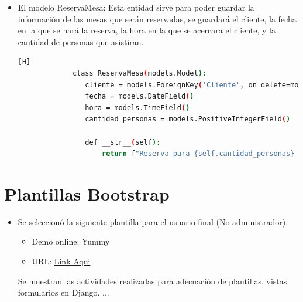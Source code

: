 \documentclass{article}
\begin{document}
\begin{itemize}
\begin{lstlisting}[language=bash,caption={Modelo de carrio}][H]
                def __str__(self):
                    return f"Carrito de {self.cliente.nombre}"
	  \end{lstlisting}
        \item El modelo ReservaMesa: Esta entidad sirve para poder guardar la información de las mesas que serán reservadas, se guardará el cliente, la fecha en la que se hará la reserva, la hora en la que se acercara el cliente, y la cantidad de personas que asistiran.
        \begin{lstlisting}[language=bash,caption={Modelo de ReservaMesa}][H]
		     class ReservaMesa(models.Model):
                cliente = models.ForeignKey('Cliente', on_delete=models.CASCADE)
                fecha = models.DateField()
                hora = models.TimeField()
                cantidad_personas = models.PositiveIntegerField()

                def __str__(self):
                    return f"Reserva para {self.cantidad_personas} personas el {self.fecha} a las {self.hora}"
	  \end{lstlisting}
  
	\end{itemize}


	\section{Plantillas Bootstrap}
	\begin{itemize}
        \item  Se seleccionó la siguiente plantilla para el usuario final (No administrador).
        \begin{itemize}
        \item  Demo online: Yummy
        \item URL: \href{https://bootstrapmade.com/yummy-bootstrap-restaurant-website-template/}{Link Aqui}
        \end{itemize}
    Se muestran las actividades realizadas para adecuación de plantillas, vistas, formularios en Django.
    ...
	\end{itemize}

        
\end{document}
